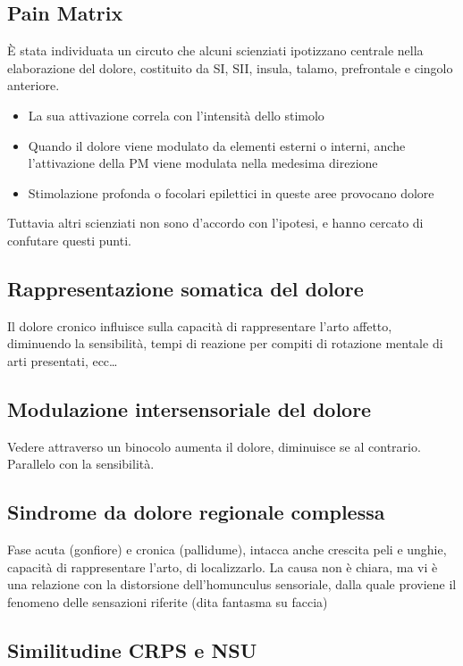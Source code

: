 \documentclass[12pt, a4paper]{article}
\begin{document}
\subsection{Pain Matrix} 

È stata individuata un circuto che alcuni scienziati ipotizzano centrale nella ela\-borazione del dolore, costituito da SI, SII, insula, talamo, prefrontale e cingolo anteriore.
\begin{itemize}
    \item La sua attivazione correla con l'intensità dello stimolo
    \item Quando il dolore viene modulato da elementi esterni o interni, anche l'attivazione della PM viene modulata nella medesima direzione
    \item Stimolazione profonda o focolari epilettici in queste aree provocano dolore
\end{itemize}
Tuttavia altri scienziati non sono d'accordo con l'ipotesi, e hanno cercato di confutare questi punti.

\subsection{Rappresentazione somatica del dolore} 

Il dolore cronico influisce sulla capacità di rappresentare l'arto affetto, diminuendo la sensibilità, tempi di reazione per compiti di rotazione mentale di arti presentati, ecc\ldots

\subsection{Modulazione intersensoriale del dolore} 

Vedere attraverso un binocolo aumenta il dolore, diminuisce se al contrario. Parallelo con la sensibilità.

\subsection{Sindrome da dolore regionale complessa} 

Fase acuta (gonfiore) e cronica (pallidume), intacca anche crescita peli e unghie, capacità di rappresentare l'arto, di localizzarlo.
La causa non è chiara, ma vi è una relazione con la distorsione dell'homunculus sensoriale, dalla quale proviene il fenomeno delle sensazioni riferite (dita fantasma su faccia) 

\subsection{Similitudine CRPS e NSU} 
\end{document}
